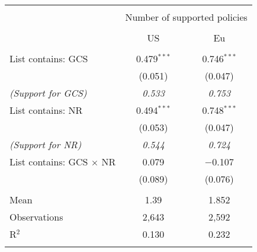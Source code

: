 
\begin{tabular}{@{\extracolsep{5pt}}lcc} 
\\[-1.8ex]\hline 
\hline \\[-1.8ex] 
 & \multicolumn{2}{c}{Number of supported policies} \\ 
\cline{2-3} 
\\[-1.8ex] & US & Eu \\ 
\hline \\[-1.8ex] 
 List contains: GCS & 0.479$^{***}$ & 0.746$^{***}$ \\ 
  & (0.051) & (0.047) \\ 
\textit{(Support for GCS)} & \textit{ 0.533 } & \textit{ 0.753 }\\
  List contains: NR & 0.494$^{***}$ & 0.748$^{***}$ \\ 
  & (0.053) & (0.047) \\ 
\textit{(Support for NR)} & \textit{ 0.544 } & \textit{ 0.724 }\\
  List contains: GCS $\times$ NR & 0.079 & $-$0.107 \\ 
  & (0.089) & (0.076) \\ 
 \hline \\[-1.8ex] 
Mean & 1.39 & 1.852 \\ 
Observations & 2,643 & 2,592 \\ 
R$^{2}$ & 0.130 & 0.232 \\ 
\hline 
\hline \\[-1.8ex] 
\end{tabular} 